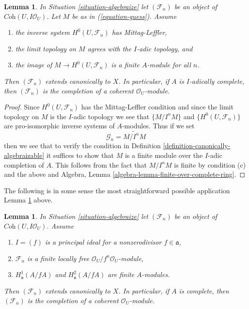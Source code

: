 \documentclass{stacks-project}
\theoremstyle{plain}
\newtheorem{lemma}[subsection]{Lemma}
\theoremstyle{definition}
\theoremstyle{remark}
\numberwithin{equation}{subsection}
\begin{document}
\begin{lemma}
\label{lemma-when-done}
In Situation \ref{situation-algebraize} let $(\mathcal{F}_n)$ be an object
of $\textit{Coh}(U, I\mathcal{O}_U)$. Let $M$ be as in (\ref{equation-guess}).
Assume
\begin{enumerate}
\item[(a)] the inverse system $H^0(U, \mathcal{F}_n)$ has Mittag-Leffler,
\item[(b)] the limit topology on $M$ agrees with the $I$-adic topology, and
\item[(c)] the image of $M \to H^0(U, \mathcal{F}_n)$ is a finite $A$-module
for all $n$.
\end{enumerate}
Then $(\mathcal{F}_n)$ extends canonically to $X$.
In particular, if $A$ is $I$-adically complete, then
$(\mathcal{F}_n)$ is the completion of a coherent $\mathcal{O}_U$-module.
\end{lemma}

\begin{proof}
Since $H^0(U, \mathcal{F}_n)$ has the Mittag-Leffler condition
and since the limit topology on $M$ is the $I$-adic topology
we see that $\{M/I^nM\}$ and $\{H^0(U, \mathcal{F}_n)\}$
are pro-isomorphic inverse systems of $A$-modules.
Thus if we set
$$
\mathcal{G}_n = \widetilde{M/I^n M}
$$
then we see that to verify the condition in
Definition \ref{definition-canonically-algebraizable}
it suffices to show that $M$ is a finite module over the
$I$-adic completion of $A$. This follows from
the fact that $M/I^n M$ is finite by condition (c)
and the above and
Algebra, Lemma \ref{algebra-lemma-finite-over-complete-ring}.
\end{proof}

\noindent
The following is in some sense the most straightforward possible application
Lemma \ref{lemma-when-done} above.

\begin{lemma}
\label{lemma-algebraization-principal-variant}
In Situation \ref{situation-algebraize} let
$(\mathcal{F}_n)$ be an object of $\textit{Coh}(U, I\mathcal{O}_U)$.
Assume
\begin{enumerate}
\item $I = (f)$ is a principal ideal for a nonzerodivisor $f \in \mathfrak a$,
\item $\mathcal{F}_n$ is a finite locally free
$\mathcal{O}_U/f^n\mathcal{O}_U$-module,
\item $H^1_\mathfrak a(A/fA)$ and $H^2_\mathfrak a(A/fA)$
are finite $A$-modules.
\end{enumerate}
Then $(\mathcal{F}_n)$ extends canonically to $X$. In particular, if $A$
is complete, then $(\mathcal{F}_n)$ is the completion of a coherent
$\mathcal{O}_U$-module.
\end{lemma}
\end{document}
